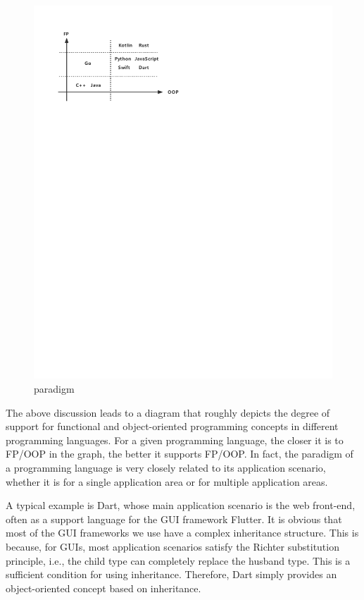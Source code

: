 \begin{figure}[htbp]
    \centerline{\includegraphics[scale=0.8]{figures/paradigm}}
    \caption{paradigm}
    \label{fig:paradigm}
\end{figure}

The above discussion leads to a diagram that roughly depicts the degree of support for functional and object-oriented programming concepts in different programming languages. For a given programming language, the closer it is to FP/OOP in the graph, the better it supports FP/OOP. In fact, the paradigm of a programming language is very closely related to its application scenario, whether it is for a single application area or for multiple application areas.

A typical example is Dart, whose main application scenario is the web front-end, often as a support language for the GUI framework Flutter. It is obvious that most of the GUI frameworks we use have a complex inheritance structure. This is because, for GUIs, most application scenarios satisfy the Richter substitution principle, i.e., the child type can completely replace the husband type. This is a sufficient condition for using inheritance. Therefore, Dart simply provides an object-oriented concept based on inheritance.

